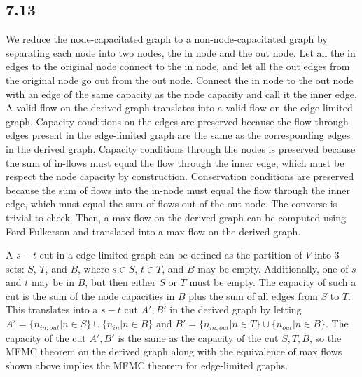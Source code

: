 \documentclass{article}
\begin{document}
\subsection*{7.13}
We reduce the node-capacitated graph to a non-node-capacitated graph by separating each node into two nodes, the in node and the out node. Let all the in edges to the original node connect to the in node, and let all the out edges from the original node go out from the out node. Connect the in node to the out node with an edge of the same capacity as the node capacity and call it the inner edge. A valid flow on the derived graph translates into a valid flow on the edge-limited graph. Capacity conditions on the edges are preserved because the flow through edges present in the edge-limited graph are the same as the corresponding edges in the derived graph. Capacity conditions through the nodes is preserved because the sum of in-flows must equal the flow through the inner edge, which must be respect the node capacity by construction. Conservation conditions are preserved because the sum of flows into the in-node must equal the flow through the inner edge, which must equal the sum of flows out of the out-node. The converse is trivial to check. Then, a max flow on the derived graph can be computed using Ford-Fulkerson and translated into a max flow on the derived graph.

A $s-t$ cut in a edge-limited graph can be defined as the partition of $V$ into $3$ sets: $S$, $T$, and $B$, where $s\in S$, $t\in T$, and $B$ may be empty. Additionally, one of $s$ and $t$ may be in $B$, but then either $S$ or $T$ must be empty. The capacity of such a cut is the sum of the node capacities in $B$ plus the sum of all edges from $S$ to $T$. This translates into a $s-t$ cut $A',B'$ in the derived graph by letting $A'=\{n_{in,out}|n\in S\}\cup\{n_{in}|n\in B\}$ and $B'=\{n_{in,out}|n\in T\}\cup\{n_{out}|n\in B\}$. The capacity of the cut $A',B'$ is the same as the capacity of the cut $S,T,B$, so the MFMC theorem on the derived graph along with the equivalence of max flows shown above implies the MFMC theorem for edge-limited graphs.
\end{document}
